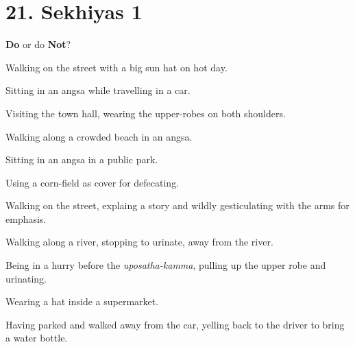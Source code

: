 \chapter{21. Sekhiyas 1}
\renewcommand*{\theChapterTitle}{21. Sekhiyas 1}

\begin{exam}{\autoExamName}

  \begin{problem*}
    \textbf{Do} or do \textbf{Not}?

    \bigskip

    \begin{parts}

    \item {} Walking on the street with a big sun hat on hot day.

    \item {} Sitting in an angsa while travelling in a car.

    \item {} Visiting the town hall, wearing the upper-robes on both shoulders.

    \item {} Walking along a crowded beach in an angsa.

    \item {} Sitting in an angsa in a public park.

    \item {} Using a corn-field as cover for defecating.

    \item {} Walking on the street, explaing a story and wildly gesticulating with the arms for emphasis.

    \item {} Walking along a river, stopping to urinate, away from the river.

    \item {} Being in a hurry before the \emph{uposatha-kamma}, pulling up the upper robe and urinating.

    \item {} Wearing a hat inside a supermarket.

    \item {} Having parked and walked away from the car, yelling back to the driver to bring a water bottle.

    \end{parts}

  \end{problem*}

\end{exam}
